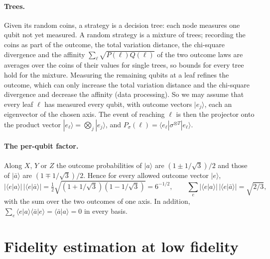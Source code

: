 \documentclass[11pt]{article}
\theoremstyle{remark}
\newcommand{\ket}[1]{|#1\rangle}
\newcommand{\bra}[1]{\langle #1|}
\newcommand{\abar}{\bar a}
\begin{document}
\paragraph{Trees.} Given its random coins, a strategy is a decision tree: each node measures one qubit not yet measured. A random strategy is a mixture of trees; recording the coins as part of the outcome, the total variation distance, the chi-square divergence and the affinity $\sum_\ell\sqrt{P(\ell)Q(\ell)}$ of the two outcome laws are averages over the coins of their values for single trees, so bounds for every tree hold for the mixture. Measuring the remaining qubits at a leaf refines the outcome, which can only increase the total variation distance and the chi-square divergence and decrease the affinity (data processing). So we may assume that every leaf $\ell$ has measured every qubit, with outcome vectors $\ket{e_j}$, each an eigenvector of the chosen axis. The event of reaching $\ell$ is then the projector onto the product vector $\ket{e_\ell} = \bigotimes_j\ket{e_j}$, and $P_\sigma(\ell) = \bra{e_\ell}\sigma^{\otimes T}\ket{e_\ell}$.

\paragraph{The per-qubit factor.} Along $X$, $Y$ or $Z$ the outcome probabilities of $\ket a$ are $(1\pm1/\sqrt3)/2$ and those of $\ket\abar$ are $(1\mp1/\sqrt3)/2$. Hence for every allowed outcome vector $\ket e$,
\begin{equation}\label{eq:factor}
|\langle e|a\rangle|\,|\langle e|\abar\rangle| = \tfrac12\sqrt{(1+1/\sqrt3)(1-1/\sqrt3)} = 6^{-1/2},\qquad \sum_{e} |\langle e|a\rangle|\,|\langle e|\abar\rangle| = \sqrt{2/3},
\end{equation}
with the sum over the two outcomes of one axis. In addition, $\sum_e \langle e|a\rangle\langle\abar|e\rangle = \langle\abar|a\rangle = 0$ in every basis.

\section{Fidelity estimation at low fidelity}\label{sec:low}
\end{document}
